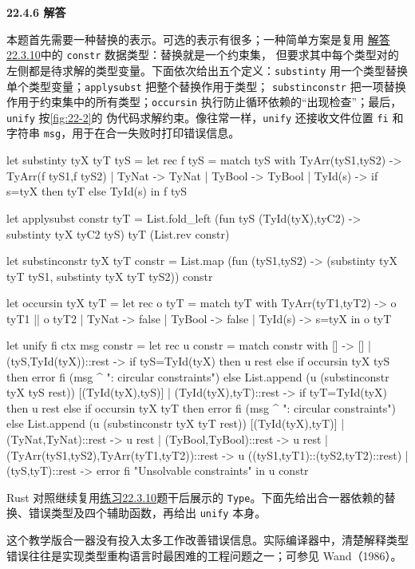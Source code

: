\begin{taplauthorsolutionentrybox}
\label{sol:author:22.4.6}
\textbf{22.4.6 解答}

本题首先需要一种替换的表示。可选的表示有很多；一种简单方案是复用
\hyperref[sol:author:22.3.10]{解答22.3.10}中的 \texttt{constr} 数据类型：替换就是一个约束集，
但要求其中每个类型对的左侧都是待求解的类型变量。下面依次给出五个定义：\texttt{substinty}
用一个类型替换单个类型变量；\texttt{applysubst} 把整个替换作用于类型；
\texttt{substinconstr} 把一项替换作用于约束集中的所有类型；\texttt{occursin}
执行防止循环依赖的“出现检查”；最后，\texttt{unify} 按\cref{fig:22-2}的
伪代码求解约束。像往常一样，\texttt{unify} 还接收文件位置 \texttt{fi} 和
字符串 \texttt{msg}，用于在合一失败时打印错误信息。
\begin{taplocamlcode}
let substinty tyX tyT tyS =
  let rec f tyS = match tyS with
      TyArr(tyS1,tyS2) -> TyArr(f tyS1,f tyS2)
    | TyNat -> TyNat
    | TyBool -> TyBool
    | TyId(s) -> if s=tyX then tyT else TyId(s)
  in f tyS

let applysubst constr tyT =
  List.fold_left
    (fun tyS (TyId(tyX),tyC2) -> substinty tyX tyC2 tyS)
    tyT (List.rev constr)

let substinconstr tyX tyT constr =
  List.map
    (fun (tyS1,tyS2) ->
      (substinty tyX tyT tyS1, substinty tyX tyT tyS2))
    constr

let occursin tyX tyT =
  let rec o tyT = match tyT with
      TyArr(tyT1,tyT2) -> o tyT1 || o tyT2
    | TyNat -> false
    | TyBool -> false
    | TyId(s) -> s=tyX
  in o tyT

let unify fi ctx msg constr =
  let rec u constr = match constr with
      [] -> []
    | (tyS,TyId(tyX))::rest ->
        if tyS=TyId(tyX) then u rest
        else if occursin tyX tyS then error fi (msg ^ ": circular constraints")
        else List.append (u (substinconstr tyX tyS rest))
                         [(TyId(tyX),tyS)]
    | (TyId(tyX),tyT)::rest ->
        if tyT=TyId(tyX) then u rest
        else if occursin tyX tyT then error fi (msg ^ ": circular constraints")
        else List.append (u (substinconstr tyX tyT rest))
                         [(TyId(tyX),tyT)]
    | (TyNat,TyNat)::rest -> u rest
    | (TyBool,TyBool)::rest -> u rest
    | (TyArr(tyS1,tyS2),TyArr(tyT1,tyT2))::rest ->
        u ((tyS1,tyT1)::(tyS2,tyT2)::rest)
    | (tyS,tyT)::rest -> error fi "Unsolvable constraints"
  in u constr
\end{taplocamlcode}
Rust 对照继续复用\hyperref[ex:22.3.10]{练习22.3.10}题干后展示的
\texttt{Type}。下面先给出合一器依赖的替换、错误类型及四个辅助函数，再给出
\texttt{unify} 本身。

这个教学版合一器没有投入太多工作改善错误信息。实际编译器中，清楚解释类型
错误往往是实现类型重构语言时最困难的工程问题之一；可参见 Wand（1986）。

\end{taplauthorsolutionentrybox}

